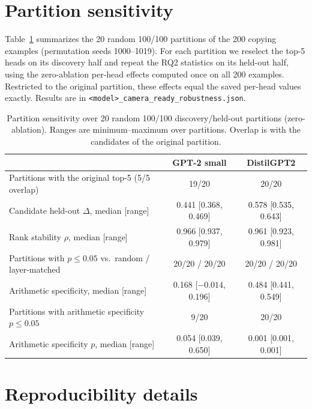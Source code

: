 \documentclass{article}
\begin{document}
\section{Partition sensitivity}
\label{app:partitions}

Table~\ref{tab:partitions} summarizes the 20 random 100/100 partitions
of the 200 copying examples (permutation seeds 1000--1019). For each
partition we reselect the top-5 heads on its discovery half and repeat
the RQ2 statistics on its held-out half, using the zero-ablation per-head
effects computed once on all 200 examples. Restricted to the original
partition, these effects equal the saved per-head values exactly. Results
are in \texttt{<model>\_camera\_ready\_robustness.json}.

\begin{table}[h]
  \caption{Partition sensitivity over 20 random 100/100 discovery/held-out
  partitions (zero-ablation). Ranges are minimum--maximum over
  partitions. Overlap is with the candidates of the original partition.}
  \label{tab:partitions}
  \centering
  \small
  \begin{tabular}{lcc}
    \toprule
    & GPT-2 small & DistilGPT2 \\
    \midrule
    Partitions with the original top-5 (5/5 overlap) & 19/20 & 20/20 \\
    Candidate held-out $\Delta$, median [range] & 0.441 [0.368, 0.469] & 0.578 [0.535, 0.643] \\
    Rank stability $\rho$, median [range] & 0.966 [0.937, 0.979] & 0.961 [0.923, 0.981] \\
    Partitions with $p\le0.05$ vs.\ random / layer-matched & 20/20 / 20/20 & 20/20 / 20/20 \\
    Arithmetic specificity, median [range] & 0.168 [$-0.014$, 0.196] & 0.484 [0.441, 0.549] \\
    Partitions with arithmetic specificity $p\le0.05$ & 9/20 & 20/20 \\
    Arithmetic specificity $p$, median [range] & 0.054 [0.039, 0.650] & 0.001 [0.001, 0.001] \\
    \bottomrule
  \end{tabular}
\end{table}

\section{Reproducibility details}
\label{app:repro}
\end{document}
